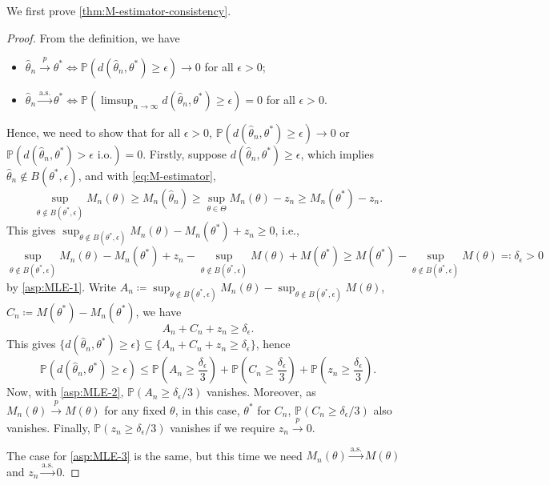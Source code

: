 We first prove \autoref{thm:M-estimator-consistency}.

\begin{proof}
	From the definition, we have
	\begin{itemize}
		\item \(\hat{\theta} _n \overset{p}{\to} \theta ^{\ast} \iff \mathbb{P} (d(\hat{\theta} _n, \theta ^{\ast} ) \geq \epsilon ) \to 0\) for all \(\epsilon > 0\);
		\item \(\hat{\theta} _n \overset{\text{a.s.} }{\to} \theta ^{\ast} \iff \mathbb{P} (\limsup_{n \to \infty} d(\hat{\theta} _n, \theta ^{\ast} ) \geq \epsilon ) = 0\) for all \(\epsilon > 0\).
	\end{itemize}
	Hence, we need to show that for all \(\epsilon > 0\), \(\mathbb{P} (d(\hat{\theta} _n , \theta ^{\ast} ) \geq \epsilon ) \to 0\) or \(\mathbb{P} (d(\hat{\theta} _n, \theta ^{\ast} ) > \epsilon \text{ i.o.} ) = 0\). Firstly, suppose \(d(\hat{\theta} _n, \theta ^{\ast} ) \geq \epsilon \), which implies \(\hat{\theta} _n \notin B(\theta ^{\ast} , \epsilon )\), and with \autoref{eq:M-estimator},
	\[
		\sup _{\theta \notin B(\theta ^{\ast} , \epsilon )} M_n(\theta )
		\geq M_n(\hat{\theta} _n)
		\geq \sup _{\theta \in \Theta } M_n(\theta ) - z_n
		\geq M_n(\theta ^{\ast} ) - z_n.
	\]
	This gives \(\sup _{\theta \notin B(\theta ^{\ast} , \epsilon )}M_n(\theta ) - M_n (\theta ^{\ast} ) + z_n \geq 0\), i.e.,
	\[
		\sup _{\theta \notin B(\theta ^{\ast} , \epsilon )} M_n(\theta ) - M_n(\theta ^{\ast} ) + z_n - \sup _{\theta \notin B(\theta ^{\ast} , \epsilon )} M(\theta ) + M(\theta ^{\ast} )
		\geq M(\theta ^{\ast} ) - \sup _{\theta \notin B(\theta ^{\ast} , \epsilon )} M(\theta )
		\eqqcolon \delta _\epsilon > 0
	\]
	by \autoref{asp:MLE-1}. Write \(A_n \coloneqq \sup _{\theta \notin B(\theta ^{\ast} , \epsilon )} M_n(\theta ) - \sup _{\theta \notin B(\theta ^{\ast} , \epsilon )} M(\theta )\), \(C_n \coloneqq M(\theta ^{\ast} ) - M_n(\theta ^{\ast} )\), we have
	\[
		A_n + C_n + z_n \geq \delta _\epsilon .
	\]
	This gives \(\{ d(\hat{\theta} _n, \theta ^{\ast} ) \geq \epsilon \} \subseteq \{ A_n + C_n + z_n \geq \delta _\epsilon  \}\), hence
	\[
		\mathbb{P} (d(\hat{\theta} _n, \theta ^{\ast} ) \geq \epsilon)
		\leq \mathbb{P} \left( A_n \geq \frac{\delta _\epsilon}{3} \right) + \mathbb{P} \left( C_n \geq \frac{\delta _\epsilon}{3} \right) + \mathbb{P} \left( z_n \geq \frac{\delta _\epsilon}{3} \right).
	\]
	Now, with \autoref{asp:MLE-2}, \(\mathbb{P} (A_n \geq \delta _\epsilon / 3)\) vanishes. Moreover, as \(M_n(\theta ) \overset{p}{\to} M(\theta )\) for any fixed \(\theta \), in this case, \(\theta ^{\ast} \) for \(C_n\), \(\mathbb{P} (C_n \geq \delta _\epsilon / 3)\) also vanishes. Finally, \(\mathbb{P} (z_n \geq \delta _\epsilon / 3)\) vanishes if we require \(z_n \overset{p}{\to} 0\).

	The case for \autoref{asp:MLE-3} is the same, but this time we need \(M_n(\theta ) \overset{\text{a.s.} }{\to} M(\theta ) \) and \(z_n \overset{\text{a.s.} }{\to} 0\).
\end{proof}

